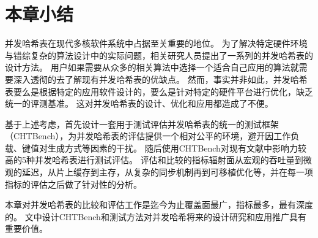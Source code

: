 \section{本章小结}
并发哈希表在现代多核软件系统中占据至关重要的地位。
为了解决特定硬件环境与错综复杂的算法设计中的实际问题，相关研究人员提出了一系列的并发哈希表的设计方法。
用户如果需要从众多的相关算法中选择一个适合自己应用的算法就需要深入透彻的去了解现有并发哈希表的优缺点。
然而，事实并非如此，并发哈希表要么是根据特定的应用软件设计的，要么是针对特定的硬件平台进行优化，缺乏统一的评测基准。
这对并发哈希表的设计、优化和应用都造成了不便。

基于上述考虑，首先设计一套用于测试评估并发哈希表的统一的测试框架（CHTBench），为并发哈希表的评估提供一个相对公平的环境，避开因工作负载、键值对生成方式等因素的干扰。
随后使用CHTBench对现有文献中影响力较高的5种并发哈希表进行测试评估。
评估和比较的指标辐射面从宏观的吞吐量到微观的延迟，从片上缓存到主存，从复杂的同步机制再到可移植优化等，并在每一项指标的评估之后做了针对性的分析。

本章对并发哈希表的比较和评估工作是迄今为止覆盖面最广，指标最多，最有深度的。
文中设计CHTBench和测试方法对并发哈希将来的设计研究和应用推广具有重要价值。 
